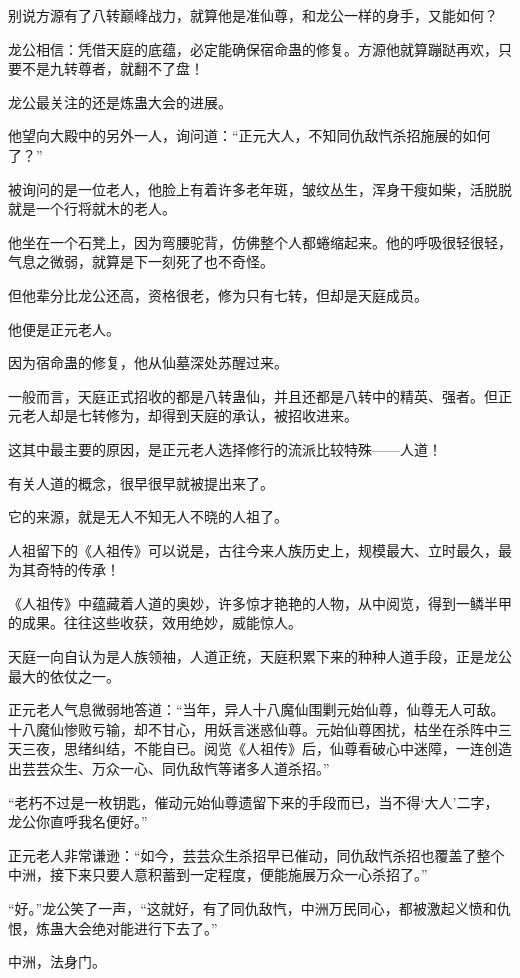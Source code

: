 \begin{this_body}
别说方源有了八转巅峰战力，就算他是准仙尊，和龙公一样的身手，又能如何？

龙公相信：凭借天庭的底蕴，必定能确保宿命蛊的修复。方源他就算蹦跶再欢，只要不是九转尊者，就翻不了盘！

龙公最关注的还是炼蛊大会的进展。

他望向大殿中的另外一人，询问道：“正元大人，不知同仇敌忾杀招施展的如何了？”

被询问的是一位老人，他脸上有着许多老年斑，皱纹丛生，浑身干瘦如柴，活脱脱就是一个行将就木的老人。

他坐在一个石凳上，因为弯腰驼背，仿佛整个人都蜷缩起来。他的呼吸很轻很轻，气息之微弱，就算是下一刻死了也不奇怪。

但他辈分比龙公还高，资格很老，修为只有七转，但却是天庭成员。

他便是正元老人。

因为宿命蛊的修复，他从仙墓深处苏醒过来。

一般而言，天庭正式招收的都是八转蛊仙，并且还都是八转中的精英、强者。但正元老人却是七转修为，却得到天庭的承认，被招收进来。

这其中最主要的原因，是正元老人选择修行的流派比较特殊——人道！

有关人道的概念，很早很早就被提出来了。

它的来源，就是无人不知无人不晓的人祖了。

人祖留下的《人祖传》可以说是，古往今来人族历史上，规模最大、立时最久，最为其奇特的传承！

《人祖传》中蕴藏着人道的奥妙，许多惊才艳艳的人物，从中阅览，得到一鳞半甲的成果。往往这些收获，效用绝妙，威能惊人。

天庭一向自认为是人族领袖，人道正统，天庭积累下来的种种人道手段，正是龙公最大的依仗之一。

正元老人气息微弱地答道：“当年，异人十八魔仙围剿元始仙尊，仙尊无人可敌。十八魔仙惨败亏输，却不甘心，用妖言迷惑仙尊。元始仙尊困扰，枯坐在杀阵中三天三夜，思绪纠结，不能自已。阅览《人祖传》后，仙尊看破心中迷障，一连创造出芸芸众生、万众一心、同仇敌忾等诸多人道杀招。”

“老朽不过是一枚钥匙，催动元始仙尊遗留下来的手段而已，当不得‘大人’二字，龙公你直呼我名便好。”

正元老人非常谦逊：“如今，芸芸众生杀招早已催动，同仇敌忾杀招也覆盖了整个中洲，接下来只要人意积蓄到一定程度，便能施展万众一心杀招了。”

“好。”龙公笑了一声，“这就好，有了同仇敌忾，中洲万民同心，都被激起义愤和仇恨，炼蛊大会绝对能进行下去了。”

中洲，法身门。


\end{this_body}
